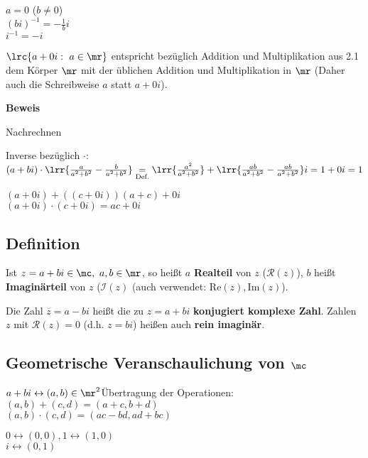 		$a=0$ ($b\neq 0$)\\
		$(bi)^{-1}=-\frac{1}{b}i$\\
		$i^{-1}=-i$
		\item $\lrc{a+0i:\ a\in\mr}$ entspricht bezüglich Addition und Multiplikation aus 2.1 dem Körper $\mr$ mit der üblichen Addition und Multiplikation in $\mr$ (Daher auch die Schreibweise $a$ statt $a+0i$).
	\subExEnd
	
	\textbf{Beweis}
		\item Nachrechnen
		\item Inverse bezüglich $\cdot$:\\
		$(a+bi)\cdot\lrr{\frac{a}{a^2+b^2}-\frac{b}{a^2+b^2}}\underset{\mbox{\scriptsize Def.}}{=}\lrr{\frac{a^2}{a^2+b^2}}+\lrr{\frac{ab}{a^2+b^2}-\frac{ab}{a^2+b^2}}i=1+0i=1$
		\item $(a+0i)+((c+0i))(a+c)+0i$\\
		$(a+0i)\cdot(c+0i)=ac+0i$
	\subExEnd
	
\subsection{Definition}
	Ist $z=a+bi\in\mc,\ a,b\in\mr$, so heißt $a$ \textbf{Realteil} von $z$ ($\mathcal{R}(z)$), $b$ heißt \textbf{Imaginärteil} von $z$ ($\mathcal{I}(z)$ (auch verwendet: $\mbox{Re}(z),\mbox{Im}(z)$).
	
	Die Zahl $\overline{z}=a-bi$ heißt die zu $z=a+bi$ \textbf{konjugiert komplexe Zahl}. Zahlen $z$ mit $\mathcal{R}(z)=0$ (d.h. $z=bi$) heißen auch \textbf{rein imaginär}.
	
\subsection{Geometrische Veranschaulichung von \texorpdfstring{$\mc$}{C}}
	$a+bi\leftrightarrow(a,b)\in\mr^2$\quad Übertragung der Operationen:\\
	$(a,b)+(c,d)=(a+c,b+d)$\\
	$(a,b)\cdot(c,d)=(ac-bd,ad+bc)$
	
	$0\leftrightarrow(0,0), 1\leftrightarrow(1,0)$\\
	$i\leftrightarrow(0,1)$
	
	

